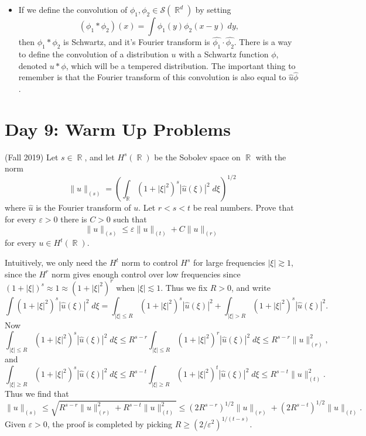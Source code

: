\documentclass{exam}
\DeclareMathOperator{\RR}{\mathbb{R}}
\theoremstyle{problemstyle}
\newcommand{\1}[1]{\textbf{1}_{\left[#1\right]}} %
\begin{document}
\begin{questions}
\begin{itemize}
	\item If we define the convolution of $\phi_1, \phi_2 \in \mathcal{S}(\RR^d)$ by setting
	\[ (\phi_1 * \phi_2)(x) = \int \phi_1(y) \phi_2(x - y)\; dy, \]
	then $\phi_1 * \phi_2$ is Schwartz, and it's Fourier transform is $\widehat{\phi_1} \cdot \widehat{\phi_2}$. There is a way to define the convolution of a distribution $u$ with a Schwartz function $\phi$, denoted $u * \phi$, which will be a tempered distribution. The important thing to remember is that the Fourier transform of this convolution is also equal to $\widehat{u} \widehat{\phi}$.
\end{itemize}









\newpage
\section*{Day 9: Warm Up Problems}

\question (Fall 2019)
    Let $s \in \RR$, and let $H^s(\RR)$ be the Sobolev space on $\RR$ with the norm
    \[ \| u \|_{(s)} = \left( \int_{\RR} (1 + |\xi|^2)^s |\widehat{u}(\xi)|^2\; d\xi \right)^{1/2} \]
    where $\widehat{u}$ is the Fourier transform of $u$. Let $r < s < t$ be real numbers. Prove that for every $\varepsilon > 0$ there is $C > 0$ such that
    \[ \| u \|_{(s)} \leq \varepsilon \| u \|_{(t)} + C \| u \|_{(r)} \]
    for every $u \in H^t(\RR)$.
\begin{solution}
    Intuitively, we only need the $H^t$ norm to control $H^s$ for large frequencies $|\xi| \gtrsim 1$, since the $H^r$ norm gives enough control over low frequencies since $(1 + |\xi|)^s \approx 1 \approx (1 + |\xi|^2)^r$ when $|\xi| \lesssim 1$. Thus we fix $R > 0$, and write
    \[ \int (1 + |\xi|^2)^s |\widehat{u}(\xi)|^2\; d\xi = \int_{|\xi| \leq R} (1 + |\xi|^2)^s |\widehat{u}(\xi)|^2 + \int_{|\xi| > R} (1 + |\xi|^2)^s |\widehat{u}(\xi)|^2. \]
    Now
    \[ \int_{|\xi| \leq R} (1 + |\xi|^2)^s |\widehat{u}(\xi)|^2\; d\xi \leq R^{s-r} \int_{|\xi| \leq R} (1 + |\xi|^2)^r |\widehat{u}(\xi)|^2\; d\xi \leq R^{s-r} \| u \|_{(r)}^2, \]
    and
    \[ \int_{|\xi| \geq R} (1 + |\xi|^2)^s |\widehat{u}(\xi)|^2\; d\xi \leq R^{s-t} \int_{|\xi| \geq R} (1 + |\xi|^2)^t |\widehat{u}(\xi)|^2\; d\xi \leq R^{s-t} \| u \|_{(t)}^2. \]
    Thus we find that
    \[ \| u \|_{(s)} \leq \sqrt{R^{s-r} \| u \|_{(r)}^2 + R^{s-t} \| u \|_{(t)}^2} \leq (2R^{s-r})^{1/2} \| u \|_{(r)} + (2R^{s-t})^{1/2} \| u \|_{(t)}.  \]
    Given $\varepsilon > 0$, the proof is completed by picking $R \geq (2/\varepsilon^2)^{1/(t-s)}$.


\end{solution}
\end{questions}
\end{document}
